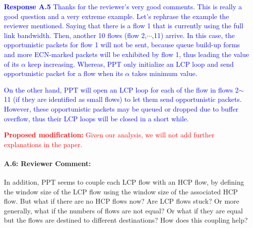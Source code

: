 \documentclass[12pt,one-column]{article}
\begin{document}
\noindent\textcolor{blue}{\textbf{Response A.5}
Thanks for the reviewer's very good comments.
This is really a good question and a very extreme example.
Let's rephrase the example the reviewer mentioned. Saying that there is a flow 1 that is currently using the full link bandwidth. Then, another 10 flows (flow 2,$\cdots$,11) arrive.
In this case, the opportunistic packets for flow 1 will not be sent, because queue build-up forms and more ECN-marked packets will be exhibited by flow 1, thus leading the value of its $\alpha$ keep increasing. Whereas, PPT only initialize an LCP loop and send opportunistic packet for a flow when its $\alpha$ takes minimum value.}

\textcolor{blue}{
On the other hand, PPT will open an LCP loop for each of the flow in flows 2$\sim$11 (if they are identified as small flows) to let them send opportunistic packets. However, these opportunistic packets may be queued or dropped due to buffer overflow, thus their LCP loops will be closed in a short while.
} 

\noindent\textcolor{red}{\textbf{Proposed modification: }
Given our analysis, we will not add further explanations in the paper.
}

%


{\it \paragraph{A.6: Reviewer Comment:} In addition, PPT seems to couple each LCP flow with an HCP flow, by defining the window size of the LCP flow using the window size of the associated HCP flow. But what if there are no HCP flows now? Are LCP flows stuck? Or more generally, what if the numbers of flows are not equal? Or what if they are equal but the flows are destined to different destinations? How does this coupling help? }	
\end{document}
